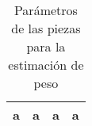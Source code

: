 \begin{center}
\begin{table}[H]
    \caption{Parámetros de las piezas para la estimación de peso}
    \label{tab:listadoPiezas:param_impresion}
    \begin{minipage}{\textwidth}
    \begin{tabular}{ |c|c|c|c| }
    \hline
    a & a & a & a \\ 
    \hline
    \end{tabular}
    \end{minipage}
\end{table}
\end{center}